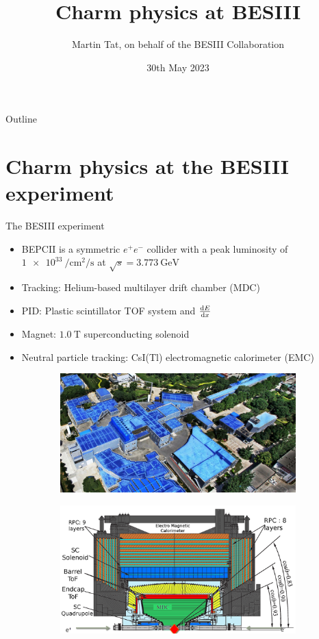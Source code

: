 \documentclass{beamer}
\title[Charm physics]{Charm physics at BESIII}
\author[Martin Tat]{Martin Tat, on behalf of the BESIII Collaboration}
\institute[University of Oxford]{\normalsize University of Oxford\\ \vspace{0.3cm}\normalsize FPCP Conference}
\date{30th May 2023}
\begin{document}
\begin{frame}
  \titlepage
\end{frame}

\begin{frame}{Outline}
  \tableofcontents
\end{frame}

\section{Charm physics at the BESIII experiment}
\begin{frame}{The BESIII experiment}
  \begin{itemize}
    \item{BEPCII is a symmetric $e^+e^-$ collider with a peak luminosity of $\SI{1e33}{\per\centi\meter\squared\per\second}$ at $\sqrt{s} = \SI{3.773}{\giga\eV}$}
    \item{Tracking: Helium-based multilayer drift chamber (MDC)}
    \item{PID: Plastic scintillator TOF system and $\dv{E}{x}$}
    \item{Magnet: $\SI{1.0}{\tesla}$ superconducting solenoid}
    \item{Neutral particle tracking: CsI(Tl) electromagnetic calorimeter (EMC)}
  \end{itemize}
  \begin{figure}
    \centering
    \begin{subfigure}{0.5\textwidth}
      \centering
      \includegraphics[width = 1.0\textwidth]{Figures/BEPCII.jpg}
    \end{subfigure}%
    \begin{subfigure}{0.5\textwidth}
      \centering
      \includegraphics[width = 1.0\textwidth]{Figures/BESIII.png}

\end{subfigure}
\end{figure}
\end{frame}
\end{document}

